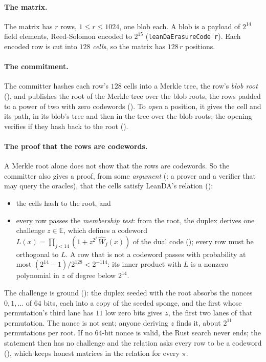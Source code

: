 \documentclass[11pt]{article}
\begin{document}
\paragraph{The matrix.} The matrix has $r$ rows, $1 \le r \le 1024$, one blob each. A blob is a
payload of $2^{14}$ field elements, Reed-Solomon encoded to $2^{15}$
(\texttt{leanDaErasureCode r}). Each encoded row is cut into $128$ \emph{cells}, so the matrix has
$128\,r$ positions.

\paragraph{The commitment.} The committer hashes each row's $128$ cells into a Merkle tree, the
row's \emph{blob root} (), and publishes the root of the Merkle tree over the
blob roots, the rows padded to a power of two with zero codewords (). To
\emph{open} a position, it gives the cell and its path, in its blob's tree and then in the tree over
the blob roots; the opening verifies if they hash back to the root ().

\paragraph{The proof that the rows are codewords.} A Merkle root alone does not show that the rows
are codewords. So the committer also gives a proof, from some \emph{argument} (: a
prover and a verifier that may query the oracles), that the cells satisfy LeanDA's relation
():
\begin{itemize}
\item the cells hash to the root, and
\item every row passes the \emph{membership test}: from the root, the duplex derives one
challenge $z \in \mathbb{E}$, which defines a codeword $L(x) = \prod_{j<14} (1 + z^{2^j}\,\widehat{W}_j(x))$ of the
dual code (); every row must be orthogonal to $L$. A row that is not a codeword
passes with probability at most $(2^{14}-1)/2^{128} < 2^{-114}$: its inner product with $L$ is a
nonzero polynomial in $z$ of degree below $2^{14}$.
\end{itemize}
The challenge is ground (): the duplex seeded with the root absorbs
the nonces $0, 1, \dots$ of $64$ bits, each into a copy of the seeded sponge, and the first whose
permutation's third lane has $11$ low zero bits gives $z$, the first two lanes of that permutation.
The nonce is not sent; anyone deriving $z$ finds it, about $2^{11}$ permutations per root. If no
$64$-bit nonce is valid, the Rust search never ends; the statement then has no challenge and the
relation asks every row to be a codeword (), which keeps honest matrices
in the relation for every $\pi$.
\end{document}
